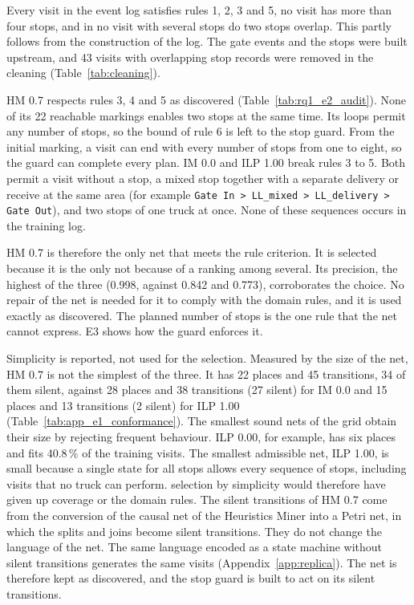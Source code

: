 Every visit in the event log satisfies rules 1, 2, 3 and 5, no visit has more than
four stops, and in no visit with several stops do two stops overlap. This partly
follows from the construction of the log. The gate events and the stops were built
upstream, and 43 visits with overlapping stop records were removed in the cleaning
(Table~\ref{tab:cleaning}).

HM 0.7 respects rules 3, 4 and 5 as discovered (Table~\ref{tab:rq1_e2_audit}).
None of its 22 reachable markings enables two stops at the same time. Its loops
permit any number of stops, so the bound of rule 6 is left to the stop guard. From
the initial marking, a visit can end with every number of stops from one to eight,
so the guard can complete every plan. IM 0.0 and ILP 1.00 break rules 3 to 5. Both
permit a visit without a stop, a mixed stop together with a separate delivery or
receive at the same area (for example
\texttt{Gate In > LL\_mixed > LL\_delivery > Gate Out}), and two stops of one truck
at once. None of these sequences occurs in the training log.

HM 0.7 is therefore the only net that meets the rule criterion. It is selected
because it is the only  not because of a ranking among several. Its
precision, the highest of the three  (0.998, against 0.842 and
0.773), corroborates the choice. No repair of the net is needed for it to comply with the domain rules,
and it is used exactly as discovered. The planned number of stops is the one rule
that the net cannot express. E3 shows how the guard enforces it.

Simplicity is reported, not used for the selection. Measured by the size of the
net, HM 0.7 is not the simplest of the three. It has 22 places and 45 transitions,
34 of them silent, against 28 places and 38 transitions (27 silent) for IM 0.0 and
15 places and 13 transitions (2 silent) for ILP 1.00
(Table~\ref{tab:app_e1_conformance}). The smallest sound nets of the grid obtain
their size by rejecting frequent behaviour. ILP 0.00, for example, has six places and
fits 40.8\,\% of the training visits. The smallest admissible net, ILP 1.00, is small
because a single state for all stops allows every sequence of stops, including
visits that no truck can perform.  selection by
simplicity would therefore have given up coverage or the domain rules. The silent transitions of HM 0.7 come from the
conversion of the causal net of the Heuristics Miner into a Petri net, in which the
splits and joins become silent transitions. They do not change the language of the
net. The same language encoded as a state machine without silent transitions
generates the same visits (Appendix~\ref{app:replica}). The net is therefore kept as
discovered, and the stop guard is built to act on its silent transitions.

